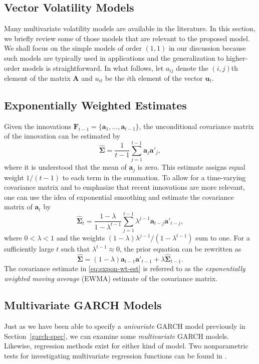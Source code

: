\subsection{Vector Volatility Models} 
Many multivariate volatility models are available in the literature. In this section, we briefly review some of those models that are relevant to the proposed model. We shall focus on the simple models of order $(1, 1)$ in our discussion because such models are typically used in applications and the generalization to higher-order models is straightforward. In what follows, let $a_{ij}$ denote the $(i, j )$th element of the matrix $\mathbf{A}$ and $u_{it}$ be the $i$th element of the vector $\mathbf{u}_t$.

\subsection{Exponentially Weighted Estimates}
Given the innovations $\mathbf{F}_{t-1}=\{\mathbf{a}_1, \ldots,\mathbf{a}_{t-1}\}$, the unconditional covariance matrix of the innovation can be estimated by
\[
\widehat{\mathbf{\Sigma}}=\frac{1}{t-1} \sum^{t-1}_{j=1}\mathbf{a}_j\mathbf{a}'_j,
\]
where it is understood that the mean of $\mathbf{a}_j$ is zero. This estimate assigns equal weight $1/(t-1)$ to each term in the summation. To allow for a time-varying covariance matrix and to emphasize that recent innovations are more relevant, one can use the idea of exponential smoothing and estimate the covariance matrix of $\mathbf{a}_t$ by
\begin{equation}
\widehat{\mathbf{\Sigma}}_t=\frac{1-\lambda}{1-\lambda^{t-1}} \sum^{t-1}_{j=1}\lambda^{j-1} \mathbf{a}_{t-j}\mathbf{a}'_{t-j},
\label{eq:expon-wt-est}
\end{equation}
where $0< \lambda< 1$ and the weights $(1-\lambda)\lambda^{j-1}/ (1-\lambda^{t-1})$ sum to one. For a sufficiently large $t$ such that $\lambda^{t-1} \approx 0$, the prior equation can be rewritten as
\[
\widehat{\mathbf{\Sigma}}=(1-\lambda)\mathbf{a}_{t-1}\mathbf{a}'_{t-1} + \lambda \widehat{\mathbf{\Sigma}}_{t-1}.
\]
The covariance estimate in \eqref{eq:expon-wt-est} is referred to as the \emph{exponentially weighted moving average} (EWMA) estimate of the covariance matrix.

\subsection{Multivariate GARCH Models}
Just as we have been able to specify a \emph{univariate} GARCH model previously in Section~\ref{garch-spec}, we can examine some \emph{multivariate} GARCH models. Likewise, regression methods exist for either kind of model. Two nonparametric tests for investigating multivariate regression functions can be found in .

